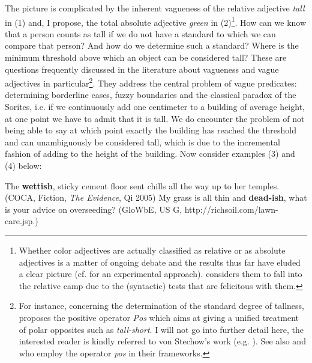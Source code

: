 \documentclass[output=paper
,modfonts
,nonflat]{langsci/langscibook}
\begin{document}
The picture is complicated by the inherent vagueness of the relative adjective  \textit{tall} in (1) and, I propose, the total absolute adjective  \textit{green} in (2)\footnote{Whether color adjectives are actually classified as relative or as absolute adjectives is a matter of ongoing debate and the results thus far have eluded a clear picture (cf. \citet*{Hansen2017} for an experimental approach). \citet{Burnett2012a, Burnett2012b} considers them to fall into the relative camp due to the (syntactic) tests that are felicitous with them.}. How can we know that a person counts as tall if we do not have a standard to which we can compare that person? And how do we determine such a standard? Where is the minimum threshold above which an object can be considered tall? These are questions frequently discussed in the literature about vagueness and vague adjectives in particular\footnote{For instance, concerning the determination of the standard degree of tallness, \citet {vonStechow1984} proposes the positive operator \textit{Pos} which aims at giving a unified treatment of polar opposites such as \textit{tall-short}. I will not go into further detail here, the interested reader is kindly referred to von Stechow's work (e.g. \citeyear{vonStechow1984,vonStechow2009}). See also \citet*{Kennedy2005} and \citet{Kennedy2007} who employ the operator \textit{pos} in their frameworks.}. They address the central problem of vague predicates: determining borderline cases, fuzzy boundaries and the classical paradox of the Sorites, i.e. if we continuously add one centimeter to a building of average height, at one point we have to admit that it is tall. We do encounter the problem of not being able to say at which point exactly the building has reached the threshold and can unambiguously be considered tall, which is due to the incremental fashion of adding to the height of the building.
Now consider examples (3) and (4) below:

\ea
	The \textbf{wettish}, sticky cement floor sent chills all the way up to her temples. (COCA, Fiction,  \textit{The Evidence}, Qi 2005)
\z
\ea
	My grass is all thin and \textbf{dead-ish}, what is your advice on overseeding? (GloWbE, US G, http://richsoil.com/lawn-care.jsp.)
\z
\end{document}
